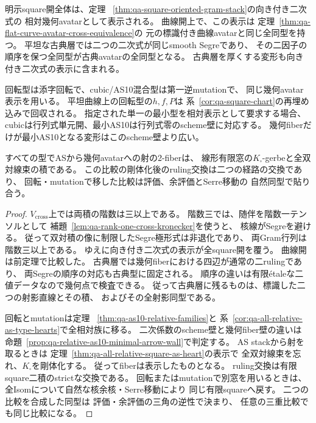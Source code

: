 \begin{corollary}[全幾何avatar表示と頂点スカラー]
\label{cor:qa-extended-geometric-avatar-all-types}
明示square開全体は、定理~
\ref{thm:qa-square-oriented-gram-stack}の向き付き二次式の
相対幾何avatarとして表示される。
曲線開上で、この表示は
定理~\ref{thm:qa-flat-curve-avatar-cross-equivalence}の
元の標識付き曲線avatarと同じ全同型を持つ。
平坦な古典層では二つの二次式が同じsmooth Segreであり、
その二因子の順序を保つ全同型が古典avatarの全同型となる。
古典層を厚くする変形も向き付き二次式の表示に含まれる。

回転型は添字回転で、cubic/AS10混合型は第一逆mutationで、
同じ幾何avatar表示を用いる。
平坦曲線上の回転型の$h,f,P$は
系~\ref{cor:qa-square-chart}の再埋め込みで回収される。
指定された単一の最小型を相対表示として要求する場合、
cubicは行列式単元開、最小AS10は行列式零のscheme壁に対応する。
幾何fiberだけが最小AS10となる変形はこのscheme壁より広い。

すべての型でASから幾何avatarへの射の2-fiberは、
線形有限窓の$K_\square$-gerbeと全双対線束の積である。
この比較の剛体化後のruling交換は二つの経路の交換であり、
回転・mutationで移した比較は評価、余評価とSerre移動の
自然同型で貼り合う。
\end{corollary}
\begin{proof}
$V_{\mathrm{cross}}$上では両積の階数は三以上である。
階数三では、随伴を階数一テンソルとして
補題~\ref{lem:qa-rank-one-cross-kronecker}を使うと、
核線がSegreを避ける。
従って双対積の像に制限したSegre極形式は非退化であり、
両Gram行列は階数三以上である。
ゆえに向き付き二次式の表示が全square開を覆う。
曲線開は前定理で比較した。
古典層では幾何fiberにおける四辺が通常の二rulingであり、
両Segreの順序の対応も古典型に固定される。
順序の違いは有限\'etaleな二値データなので幾何点で検査できる。
従って古典層に残るものは、標識した二つの射影直線とその積、
およびその全射影同型である。

回転とmutationは定理~
\ref{thm:qa-as10-relative-families}と
系~\ref{cor:qa-all-relative-as-type-hearts}で全相対族に移る。
二次係数のscheme壁と幾何fiber壁の違いは
命題~\ref{prop:qa-relative-as10-minimal-arrow-wall}で判定する。
AS stackから射を取るときは
定理~\ref{thm:qa-all-relative-square-as-heart}の表示で
全双対線束を忘れ、$K_\square$を剛体化する。
従ってfiberは表示したものとなる。
ruling交換は有限square二積のstrictな交換である。
回転またはmutationで別窓を用いるときは、
全Isomについて自然な核余核・Serre移動により
同じ有限squareへ戻す。
二つの比較を合成した同型は
評価・余評価の三角の逆性で決まり、
任意の三重比較でも同じ比較になる。
\end{proof}

